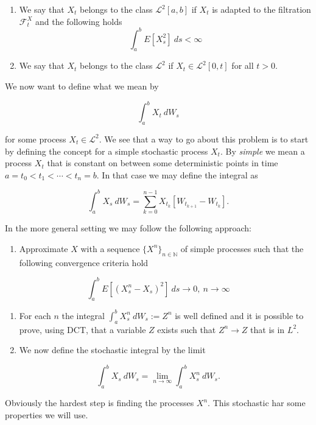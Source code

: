 \documentclass[
]{article}
\providecommand{\tightlist}{%
  \setlength{\itemsep}{0pt}\setlength{\parskip}{0pt}}
\begin{document}
\begin{enumerate}
\def\labelenumi{\roman{enumi}.}
\tightlist
\item
  We say that \(X_t\) belongs to the class \(\mathcal{L}^2[a,b]\) if
  \(X_t\) is adapted to the filtration \(\mathcal{F}^X_t\) and the
  following holds \[\int_a^bE[X_s^2]\ ds<\infty\]
\item
  We say that \(X_t\) belongs to the class \(\mathcal{L}^2\) if
  \(X_t\in\mathcal{L}^2[0,t]\) for all \(t>0\).
\end{enumerate}

We now want to define what we mean by

\[
\int_a^bX_t\ dW_s
\]

for some process \(X_t\in\mathcal{L}^2\). We see that a way to go about
this problem is to start by defining the concept for a simple stochastic
process \(X_t\). By \emph{simple} we mean a process \(X_t\) that is
constant on between some deterministic points in time
\(a=t_0<t_1<\cdots<t_n=b\). In that case we may define the integral as

\[
\int_a^bX_s\ dW_s = \sum_{k=0}^{n-1}X_{t_k}[W_{t_{k+1}}-W_{t_k}].
\]

In the more general setting we may follow the following approach:

\begin{enumerate}
\def\labelenumi{\arabic{enumi}.}
\tightlist
\item
  Approximate \(X\) with a sequence \(\{X^n\}_{n\in\mathbb{N}}\) of
  simple processes such that the following convergence criteria hold
\end{enumerate}

\[
  \int_a^bE[(X_s^n-X_s)^2]\ ds\to 0,\ n\to\infty
  \]

\begin{enumerate}
\def\labelenumi{\arabic{enumi}.}
\setcounter{enumi}{1}
\tightlist
\item
  For each \(n\) the integral \(\int_a^b X_s^n\ dW_s:=Z^n\) is well
  defined and it is possible to prove, using DCT, that a variable \(Z\)
  exists such that \(Z^n\to Z\) that is in \(L^2\).
\item
  We now define the stochastic integral by the limit
\end{enumerate}

\[
  \int_a^b X_s\ dW_s=\lim_{n\to \infty}\int_a^b X_s^n\ dW_s.
  \]

Obviously the hardest step is finding the processes \(X^n\). This
stochastic har some properties we will use.
\end{document}

